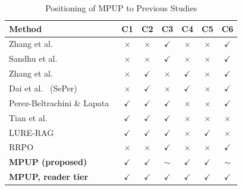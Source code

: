 \documentclass[conference]{IEEEtran}
\begin{document}
\begin{table}[htbp]
    \centering
    \small
    \setlength{\tabcolsep}{3pt}
    \caption{Positioning of MPUP to Previous Studies}
    \label{tab:mpup_positioning}
    \begin{tabular}{lcccccc}
        \toprule
        Method & C1 & C2 & C3 & C4 & C5 & C6 \\
        \midrule
        Zhang et al.~\cite{zhang2025b} & $\times$ & $\times$ & $\checkmark$ & $\times$ & $\times$ & $\checkmark$ \\
        Sandhu et al.~\cite{sandhu2026} & $\times$ & $\times$ & $\checkmark$ & $\times$ & $\times$ & $\checkmark$ \\
        Zhang et al.~\cite{zhang2025c} & $\times$ & $\checkmark$ & $\times$ & $\checkmark$ & $\times$ & $\checkmark$ \\
        Dai et al.~\cite{dai2025} (SePer) & $\times$ & $\checkmark$ & $\times$ & $\checkmark$ & $\times$ & $\checkmark$ \\
        Perez-Beltrachini \& Lapata~\cite{perez2025} & $\checkmark$ & $\checkmark$ & $\checkmark$ & $\times$ & $\times$ & $\checkmark$ \\
        Tian et al.~\cite{tian2026} & $\checkmark$ & $\checkmark$ & $\checkmark$ & $\times$ & $\times$ & $\times$ \\
        LURE-RAG~\cite{chandra2026} & $\checkmark$ & $\checkmark$ & $\checkmark$ & $\times$ & $\checkmark$ & $\times$ \\
        RRPO~\cite{wu2026} & $\times$ & $\times$ & $\checkmark$ & $\times$ & $\times$ & $\checkmark$ \\
        \textbf{MPUP (proposed)} & $\checkmark$ & $\checkmark$ & $\sim$ & $\checkmark$ & $\checkmark$ & $\sim$ \\
        \textbf{MPUP, reader tier} & $\checkmark$ & $\checkmark$ & $\checkmark$ & $\checkmark$ & $\checkmark$ & $\checkmark$ \\
        \bottomrule

\end{tabular}
\end{table}
\end{document}
